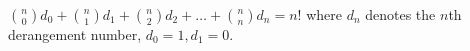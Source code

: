 \documentclass{book}
\begin{document}
\setcounter{cpjt}{107}
\addtocounter{cpjt}{-1}
\begin{activity}\label{activity-100}
\hypertarget{p-732}{}%
\(\binom{n}{0} d_{0} + \binom{n}{1} d_{1} + \binom{n}{2} d_{2} + \ldots + \binom{n}{n} d_{n} = n!\) where \(d_{n}\) denotes the \(n\)th derangement number, \(d_{0} = 1,d_{1} = 0\).%
\par\smallskip%
\noindent\end{activity}

\clearpage
\end{document}
